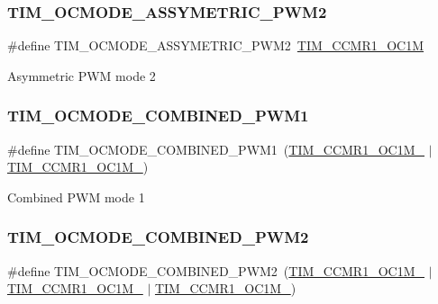 \subsubsection{\texorpdfstring{TIM\_OCMODE\_ASSYMETRIC\_PWM2}{TIM\_OCMODE\_ASSYMETRIC\_PWM2}}
{\footnotesize\ttfamily \#define T\+I\+M\+\_\+\+O\+C\+M\+O\+D\+E\+\_\+\+A\+S\+S\+Y\+M\+E\+T\+R\+I\+C\+\_\+\+P\+W\+M2~\mbox{\hyperlink{group___peripheral___registers___bits___definition_ga6ddb3dc889733e71d812baa3873cb13b}{T\+I\+M\+\_\+\+C\+C\+M\+R1\+\_\+\+O\+C1M}}}

Asymmetric P\+WM mode 2 \mbox{\label{group___t_i_m___output___compare__and___p_w_m__modes_gaa13e0cb2370d61cfee1241498733b38b}} 
\subsubsection{\texorpdfstring{TIM\_OCMODE\_COMBINED\_PWM1}{TIM\_OCMODE\_COMBINED\_PWM1}}
{\footnotesize\ttfamily \#define T\+I\+M\+\_\+\+O\+C\+M\+O\+D\+E\+\_\+\+C\+O\+M\+B\+I\+N\+E\+D\+\_\+\+P\+W\+M1~(\mbox{\hyperlink{group___peripheral___registers___bits___definition_gac93dfe7865726bc84363684b9fa01c93}{T\+I\+M\+\_\+\+C\+C\+M\+R1\+\_\+\+O\+C1\+M\+\_}} $\vert$ \mbox{\hyperlink{group___peripheral___registers___bits___definition_gac024f6b9972b940925ab5786ee38701b}{T\+I\+M\+\_\+\+C\+C\+M\+R1\+\_\+\+O\+C1\+M\+\_}})}

Combined P\+WM mode 1 \mbox{\label{group___t_i_m___output___compare__and___p_w_m__modes_gaf983419ff3d5bc0ca8d122bb8f321eff}} 
\subsubsection{\texorpdfstring{TIM\_OCMODE\_COMBINED\_PWM2}{TIM\_OCMODE\_COMBINED\_PWM2}}
{\footnotesize\ttfamily \#define T\+I\+M\+\_\+\+O\+C\+M\+O\+D\+E\+\_\+\+C\+O\+M\+B\+I\+N\+E\+D\+\_\+\+P\+W\+M2~(\mbox{\hyperlink{group___peripheral___registers___bits___definition_gac93dfe7865726bc84363684b9fa01c93}{T\+I\+M\+\_\+\+C\+C\+M\+R1\+\_\+\+O\+C1\+M\+\_}} $\vert$ \mbox{\hyperlink{group___peripheral___registers___bits___definition_ga410a4752a98081bad8ab3f72b28e7c5f}{T\+I\+M\+\_\+\+C\+C\+M\+R1\+\_\+\+O\+C1\+M\+\_}} $\vert$ \mbox{\hyperlink{group___peripheral___registers___bits___definition_gac024f6b9972b940925ab5786ee38701b}{T\+I\+M\+\_\+\+C\+C\+M\+R1\+\_\+\+O\+C1\+M\+\_}})}

